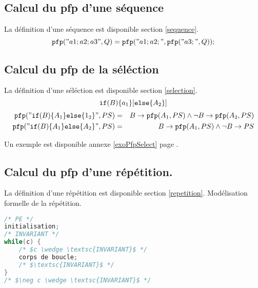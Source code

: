 	\subsection{Calcul du pfp d'une séquence}\label{pfpsequence}
		La définition d'une séquence est disponible section \ref{sequence}.
	$$\texttt{pfp}("a1;a2;a3", Q) = \texttt{pfp}("a1;a2;", \texttt{pfp}("a3;", Q));$$
\subsection{Calcul du pfp de la séléction}\label{pfpselection} 
		La définition d'une séléction est disponible section \ref{selection}.
		$$\ifp (B)\{a_1\} [\elsep \{A_2\}]$$
\begin{eqnarray*}
	\texttt{pfp}("\texttt{if}(B)\{A_1\}\texttt{else}\{1_2\}", PS) &=&
	B \rightarrow \texttt{pfp}(A_1, PS) \wedge \neg B \rightarrow \texttt{pfp} (A_2, PS)\\
	\texttt{pfp}("\texttt{if}(B)\{A_1\}\texttt{else}\{A_2\}", PS) &=& B \rightarrow \texttt{pfp}(A_1, PS) \wedge \neg B \rightarrow PS 
\end{eqnarray*}

Un exemple est disponible annexe \ref{exoPfpSelect} page \pageref{exoPfpSelect}.

\subsection{Calcul du pfp d'une répétition.}\label{pfpBoucle}
		La définition d'une répétition est disponible section \ref{repetition}.
Modélisation formelle de la répétition.
\begin{lstlisting}[language=C]
/* PE */
initialisation;
/* INVARIANT */
while(c) {
	/* $c \wedge \textsc{INVARIANT}$ */
	corps de boucle;
	/* $\textsc{INVARIANT}$ */
}
/* $\neg c \wedge \textsc{INVARIANT}$ */
\end{lstlisting}

